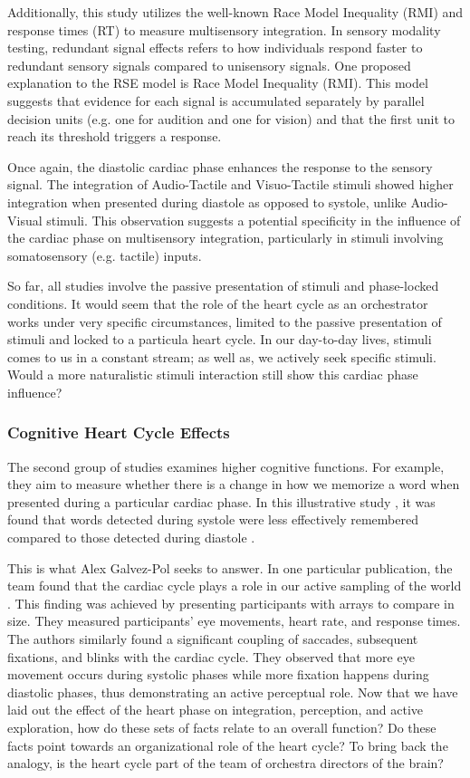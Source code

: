 \documentclass[12pt,oneside,openright]{report}
\begin{document}
Additionally, this study utilizes the well-known Race Model Inequality (RMI) and response times (RT) to measure multisensory integration. In sensory modality testing, redundant signal effects refers to how individuals respond faster to redundant sensory signals compared to unisensory signals. One proposed explanation to the RSE model is Race Model Inequality (RMI). This model suggests that evidence for each signal is accumulated separately by parallel decision units (e.g. one for audition and one for vision) and that the first unit to reach its threshold triggers a response. 

Once again, the diastolic cardiac phase enhances the response to the sensory signal. The integration of Audio-Tactile and Visuo-Tactile stimuli showed higher integration when presented during diastole as opposed to systole, unlike Audio-Visual stimuli. This observation suggests a potential specificity in the influence of the cardiac phase on multisensory integration, particularly in stimuli involving somatosensory (e.g. tactile) inputs.

So far, all studies involve the passive presentation of stimuli and phase-locked conditions. It would seem that the role of the heart cycle as an orchestrator works under very specific circumstances, limited to the passive presentation of stimuli and locked to a particula heart cycle. In our day-to-day lives, stimuli comes to us in a constant stream; as well as, we actively seek specific stimuli. Would a more naturalistic stimuli interaction still show this cardiac phase influence?

\subsubsection*{Cognitive Heart Cycle Effects}

The second group of studies examines higher cognitive functions. For example, they aim to measure whether there is a change in how we memorize a word when presented during a particular cardiac phase. In this illustrative study \parencite{Garfinkel2013-st}, it was found that words detected during systole were less effectively remembered compared to those detected during diastole \parencite{Garfinkel2013-st}. 

This is what Alex Galvez-Pol seeks to answer. In one particular publication, the team found that the cardiac cycle plays a role in our active sampling of the world \parencite{GalvezPol2018ActiveSI}. This finding was achieved by presenting participants with arrays to compare in size. They measured participants' eye movements, heart rate, and response times. The authors similarly found a significant coupling of saccades, subsequent fixations, and blinks with the cardiac cycle. They observed that more eye movement occurs during systolic phases while more fixation happens during diastolic phases, thus demonstrating an active perceptual role. Now that we have laid out the effect of the heart phase on integration, perception, and active exploration, how do these sets of facts relate to an overall function? Do these facts point towards an organizational role of the heart cycle? To bring back the analogy, is the heart cycle part of the team of orchestra directors of the brain?
\end{document}

